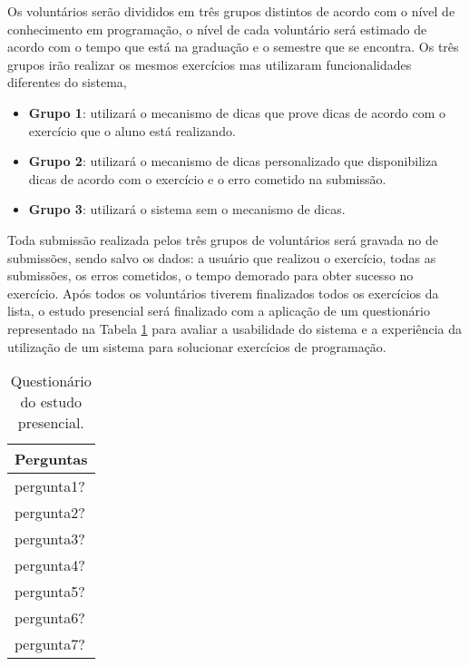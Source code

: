 Os voluntários serão divididos em três grupos distintos de acordo com o nível de conhecimento em programação, o nível de cada voluntário será estimado de acordo com o tempo que está na graduação e o semestre que se encontra. Os três grupos irão realizar os mesmos exercícios mas utilizaram funcionalidades diferentes do sistema,  

\begin{itemize}
	\item \textbf{Grupo 1}: utilizará o mecanismo de dicas que prove dicas de acordo com o exercício que o aluno está realizando.
	
	\item \textbf{Grupo 2}: utilizará o mecanismo de dicas personalizado que disponibiliza dicas de acordo com o exercício e o erro cometido na submissão.

	\item \textbf{Grupo 3}: utilizará o sistema sem o mecanismo de dicas.
\end{itemize}

Toda submissão realizada pelos três grupos de voluntários será gravada no  de submissões, sendo salvo os dados: a usuário que realizou o exercício, todas as submissões, os erros cometidos, o tempo demorado para obter sucesso no exercício. Após todos os voluntários tiverem finalizados todos os exercícios da lista, o estudo presencial será finalizado com a aplicação de um questionário representado na Tabela \ref{tabela:questionárioestudo} para avaliar a usabilidade do sistema e a experiência da utilização de um sistema  para solucionar exercícios de programação.

\begin{table}[]
	\centering
	\captionsetup{justification=centering}
	\caption{Questionário do estudo presencial.}
	\label{tabela:questionárioestudo}
	\begin{tabular}{l}
		\hline
		Perguntas                        \\ \hline
		pergunta1?                            \\
		pergunta2?                           \\
		pergunta3?                        \\
		pergunta4?                           \\
		pergunta5?                           \\
		pergunta6? \\
		pergunta7?                        \\ \hline
	\end{tabular}
\end{table}

